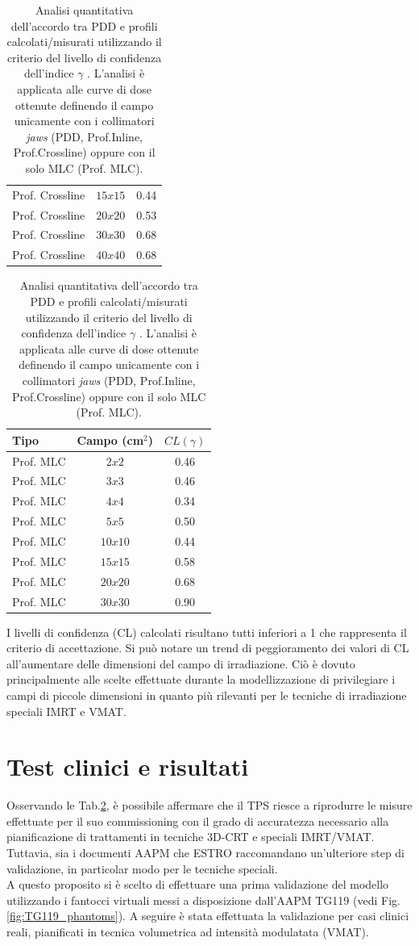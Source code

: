 \begin{table}
\begin{tabular}{lcc}
Prof. Crossline & $15x15$ & 0.44\\
Prof. Crossline & $20x20$ & 0.53\\
Prof. Crossline & $30x30$ & 0.68\\
Prof. Crossline & $40x40$ & 0.68\\
\bottomrule
\end{tabular}
\begin{tabular}{lcc}
\toprule
Tipo & Campo (cm$^2$) & $CL(\gamma)$\\
\midrule
Prof. MLC & $2x2$ & 0.46\\
Prof. MLC & $3x3$ & 0.46\\
Prof. MLC & $4x4$ & 0.34\\
Prof. MLC & $5x5$ & 0.50\\
Prof. MLC & $10x10$ & 0.44\\
Prof. MLC & $15x15$ & 0.58\\
Prof. MLC & $20x20$ & 0.68\\
Prof. MLC & $30x30$ & 0.90\\
\bottomrule
\end{tabular}
\caption{Analisi quantitativa dell'accordo tra PDD e profili calcolati/misurati utilizzando il criterio del livello di confidenza dell'indice $\gamma$ \cite{Mijnheer2004,Ezzell2009}. L'analisi è applicata alle curve di dose ottenute definendo il campo unicamente con i collimatori \textit{jaws} (PDD, Prof.Inline, Prof.Crossline) oppure con il solo MLC (Prof. MLC).}
\label{tab:Ray_ALL_meas_calc}
\end{table}

I livelli di confidenza (CL) calcolati risultano tutti inferiori a 1 che rappresenta il criterio di accettazione. Si può notare un trend di peggioramento dei valori di CL all'aumentare delle dimensioni del campo di irradiazione. Ciò è dovuto principalmente alle scelte effettuate durante la modellizzazione di privilegiare i campi di piccole dimensioni in quanto più rilevanti per le tecniche di irradiazione speciali IMRT e VMAT.





\section{Test clinici e risultati}
Osservando le Tab.\ref{tab:Ray_ALL_meas_calc}, è possibile affermare che il TPS riesce a riprodurre le misure effettuate per il suo commissioning con il grado di accuratezza necessario alla pianificazione di trattamenti in tecniche 3D-CRT e speciali IMRT/VMAT. Tuttavia,  sia i documenti AAPM \cite{Ezzell2009} che ESTRO \cite{Mijnheer2005} raccomandano un'ulteriore step di validazione, in particolar modo per le tecniche speciali.\\
A questo proposito si è scelto di effettuare una prima validazione del modello utilizzando i fantocci virtuali messi a disposizione dall'AAPM TG119 \cite{Ezzell2009} (vedi Fig.\ref{fig:TG119_phantoms}). A seguire è stata effettuata la validazione per casi clinici reali, pianificati in tecnica volumetrica ad intensità modulatata (VMAT).

